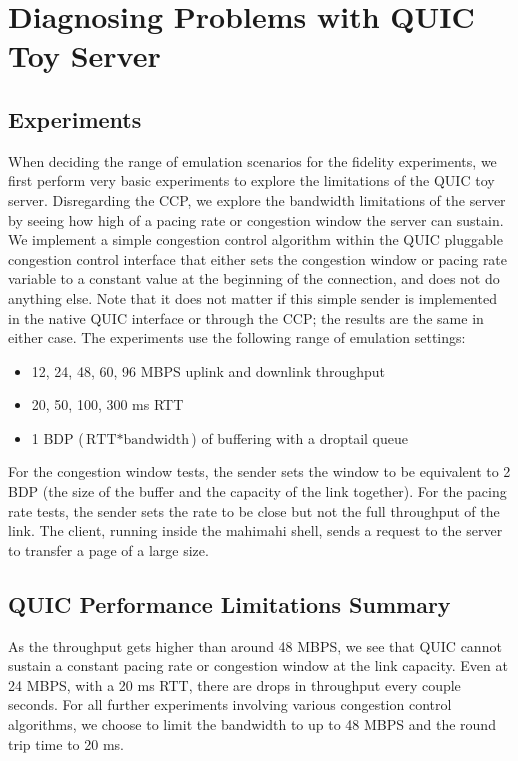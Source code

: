 \section{Diagnosing Problems with QUIC Toy Server}

\subsection*{Experiments}
When deciding the range of emulation scenarios for the fidelity experiments, we first perform very basic experiments to explore the limitations of the QUIC toy server.
Disregarding the CCP, we explore the bandwidth limitations of the server by seeing how high of a pacing rate or congestion window the server can sustain.
We implement a simple congestion control algorithm within the QUIC pluggable congestion control interface that either sets the congestion window or pacing rate variable to a constant value at the beginning of the connection, and does not do anything else.
Note that it does not matter if this simple sender is implemented in the native QUIC interface or through the CCP; the results are the same in either case.
The experiments use the following range of emulation settings:
\begin{itemize}
    \item 12, 24, 48, 60, 96 MBPS uplink and downlink throughput
    \item 20, 50, 100, 300 ms RTT
    \item 1 BDP ($\textrm{RTT} * \textrm{bandwidth}$) of buffering with a droptail queue
\end{itemize}
For the congestion window tests, the sender sets the window to be equivalent to 2 BDP (the size of the buffer and the capacity of the link together).
For the pacing rate tests, the sender sets the rate to be close but not the full throughput of the link.
The client, running inside the mahimahi shell, sends a request to the server to transfer a page of a large size.

\subsection*{QUIC Performance Limitations Summary}
As the throughput gets higher than around 48 MBPS, we see that QUIC cannot sustain a constant pacing rate or congestion window at the link capacity.
Even at 24 MBPS, with a 20 ms RTT, there are drops in throughput every couple seconds.
For all further experiments involving various congestion control algorithms, we choose to limit the bandwidth to up to 48 MBPS and the round trip time to 20 ms.

